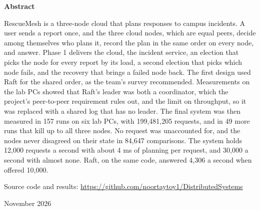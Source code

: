 \documentclass[10pt,a4paper]{article}
\begin{document}
\begin{titlepage}
  {\large\bfseries Abstract\par}
  \vspace{0.3cm}
  \begin{minipage}{0.88\linewidth}
  RescueMesh is a three-node cloud that plans responses to campus incidents. A user sends a report once, and the three cloud nodes, which are equal peers, decide among themselves who plans it, record the plan in the same order on every node, and answer. Phase 1 delivers the cloud, the incident service, an election that picks the node for every report by its load, a second election that picks which node fails, and the recovery that brings a failed node back. The first design used Raft for the shared order, as the team's survey recommended. Measurements on the lab PCs showed that Raft's leader was both a coordinator, which the project's peer-to-peer requirement rules out, and the limit on throughput, so it was replaced with a shared log that has no leader. The final system was then measured in 157 runs on six lab PCs, with 199,481,205 requests, and in 49 more runs that kill up to all three nodes. No request was unaccounted for, and the nodes never disagreed on their state in 84,647 comparisons. The system holds 12,000 requests a second with about 4 ms of planning per request, and 30,000 a second with almost none. Raft, on the same code, answered 4,306 a second when offered 10,000.
  \end{minipage}
  \vfill
  {\small Source code and results: \url{https://github.com/noortaytoy1/DistributedSystems}\par}
  {\small November 2026\par}
\end{titlepage}

\tableofcontents
\newpage













\end{document}

